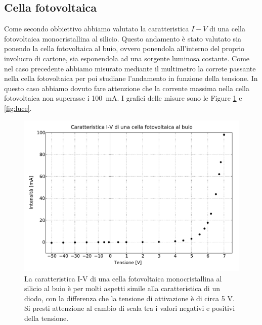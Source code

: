 \subsection*{Cella fotovoltaica}

Come secondo obbiettivo abbiamo valutato la caratteristica $I-V$ di una cella fotovoltaica monocristallina al silicio. Questo andamento è stato valutato sia ponendo la cella fotovoltaica al buio, ovvero ponendola all'interno del proprio involucro di cartone, sia esponendola ad una sorgente luminosa costante.
Come nel caso precedente abbiamo misurato mediante il multimetro la correte passante nella cella fotovoltaica per poi studiane l'andamento in funzione della tensione.
In questo caso abbiamo dovuto fare attenzione che la corrente massima nella cella fotovoltaica non superasse i \SI{100}{\milli\ampere}. I grafici delle misure sono le Figure \ref{fig:buio} e \ref{fig:luce}.

\begin{figure}
    \includegraphics[scale=0.55]{buio.pdf}
    \caption{La caratteristica I-V di una cella fotovoltaica monocristallina al silicio al buio è per molti aspetti simile alla caratteristica di un diodo, con la differenza che la tensione di attivazione è di circa 5 V. Si presti attenzione al cambio di scala tra i valori negativi e positivi della tensione.}
    \label{fig:buio}
\end{figure}

